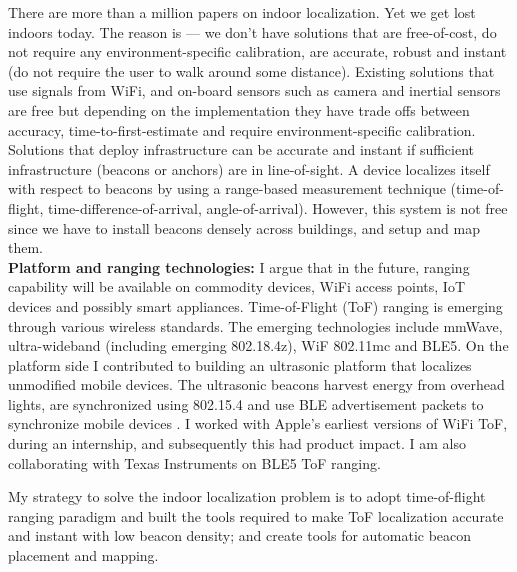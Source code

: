 \documentclass[10pt]{article}
\begin{document}
There are more than a million papers on indoor localization. Yet we get lost indoors today. The reason is --- we don't have solutions that are free-of-cost, do not require any environment-specific calibration, are accurate, robust and instant (do not require the user to walk around some distance). Existing solutions that use signals from WiFi, and on-board sensors such as camera and inertial sensors are free but depending on the implementation they have trade offs between accuracy, time-to-first-estimate and require environment-specific calibration. Solutions that deploy infrastructure can be accurate and instant if sufficient infrastructure (beacons or anchors) are in line-of-sight. A device localizes itself with respect to beacons by using a range-based measurement technique (time-of-flight, time-difference-of-arrival, angle-of-arrival). However, this system is not free since we have to install beacons densely across buildings, and setup and map them. \\



\textbf{Platform and ranging technologies:} I argue that in the future, ranging capability will be available on commodity devices, WiFi access points, IoT devices and possibly smart appliances. %
Time-of-Flight (ToF) ranging is emerging through various wireless standards. %
The emerging technologies include mmWave, ultra-wideband (including emerging 802.18.4z), WiF 802.11mc and BLE5. On the platform side I contributed to building an ultrasonic platform that localizes unmodified mobile devices. The ultrasonic beacons harvest energy from overhead lights, are synchronized using 802.15.4 and use BLE advertisement packets to synchronize mobile devices
\cite{rtas-alps-platform, lazik2015alps,lazik2015alpsdemo}. I worked with Apple's earliest versions of WiFi ToF, during an internship, and subsequently this had product impact. I am also collaborating with Texas Instruments on BLE5 ToF ranging. 

My strategy to solve the indoor localization problem is to adopt time-of-flight ranging paradigm and built the tools required to make ToF localization accurate and instant with low beacon density; and create tools for automatic beacon placement and mapping. 
\end{document}

